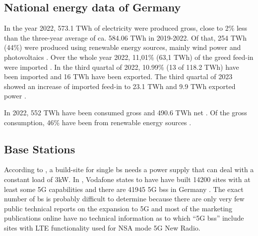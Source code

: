 \documentclass[11pt,a4paper]{article}
\begin{document}
\subsection{National energy data of Germany}\label{subsec:nationalaverage}
In the year 2022, 573.1 TWh of electricity were produced gross, close to 2\% less than the three-year average of ca. 584.06 TWh in 2019-2022.
Of that, 254 TWh (44\%) were produced using renewable energy sources, mainly wind power and photovoltaics \citep{Bruttostromerzeugung}.
Over the whole year 2022, 11,01\% (63,1 TWh) of the greed feed-in were imported \citep{energieErzeugung}.
In the third quartal of 2022, 10.99\% (13 of 118.2 TWh) have been imported and 16 TWh have been exported.
The third quartal of 2023 showed an increase of imported feed-in to 23.1 TWh and 9.9 TWh exported power \citep{stromerzeugung3Quartal2023}.

In 2022, 552 TWh have been consumed gross \citep{Stromverbrauch} and 490.6 TWh net \citep{NettoStromverbrauch}.
Of the gross consumption, 46\% have been from renewable energy sources \citep{Stromverbrauch}.

\subsection{Base Stations}\label{subsec:BSInfluence}

According to \cite{BSStandort}, a build-site for single \acrshort{bs} needs a power supply that can deal with a constant load of 3kW.
In \cite{vodafoneAusbau}, Vodafone states to have have built 14200 sites with at least some 5G capabilities and there are 41945 5G \acrlong{bs}s in Germany \citep{5gBS}.
The exact number of \acrshort*{bs} is probably difficult to determine because there are only very few public technical reports on the expansion to 5G and most of the marketing publications online have no technical information as to which \enquote{5G \acrlong{bs}s} include sites with LTE functionality used for NSA mode 5G New Radio.
\end{document}
